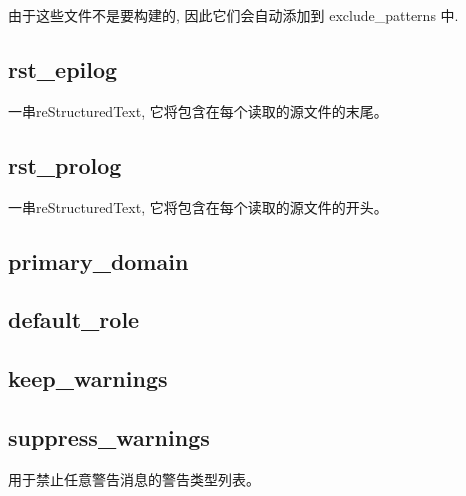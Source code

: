 \documentclass[a4paper,10pt,english]{sphinxmanual}
\begin{document}
\sphinxAtStartPar
由于这些文件不是要构建的, 因此它们会自动添加到 exclude\_patterns 中.


\subsection{rst\_epilog}
\label{\detokenize{sphinx_conf:rst-epilog}}
\sphinxAtStartPar
一串reStructuredText, 它将包含在每个读取的源文件的末尾。

\begin{sphinxVerbatim}[commandchars=\\\{\}]
  
\end{sphinxVerbatim}


\subsection{rst\_prolog}
\label{\detokenize{sphinx_conf:rst-prolog}}
\sphinxAtStartPar
一串reStructuredText, 它将包含在每个读取的源文件的开头。

\begin{sphinxVerbatim}[commandchars=\\\{\}]
  
\end{sphinxVerbatim}


\subsection{primary\_domain}
\label{\detokenize{sphinx_conf:primary-domain}}

\subsection{default\_role}
\label{\detokenize{sphinx_conf:default-role}}

\subsection{keep\_warnings}
\label{\detokenize{sphinx_conf:keep-warnings}}

\subsection{suppress\_warnings}
\label{\detokenize{sphinx_conf:suppress-warnings}}
\sphinxAtStartPar
用于禁止任意警告消息的警告类型列表。
\end{document}
